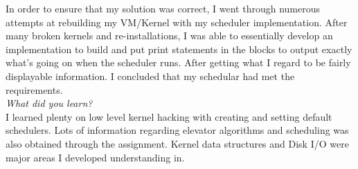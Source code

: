 \documentclass[letterpaper,10pt,titlepage]{article}
\begin{document}
In order to ensure that my solution was correct, I went through numerous attempts at rebuilding my VM/Kernel with my scheduler implementation. After many broken kernels and re-installations, I was able to essentially develop an implementation to build and put print statements in the blocks to output exactly what's going on when the scheduler runs. After getting what I regard to be fairly displayable information. I concluded that my schedular had met the requirements.\\

\textit{What did you learn?}\\

I learned plenty on low level kernel hacking with creating and setting default schedulers. Lots of information regarding elevator algorithms and scheduling was also obtained through the assignment. Kernel data structures and Disk I/O were major areas I developed understanding in.
\end{document}

